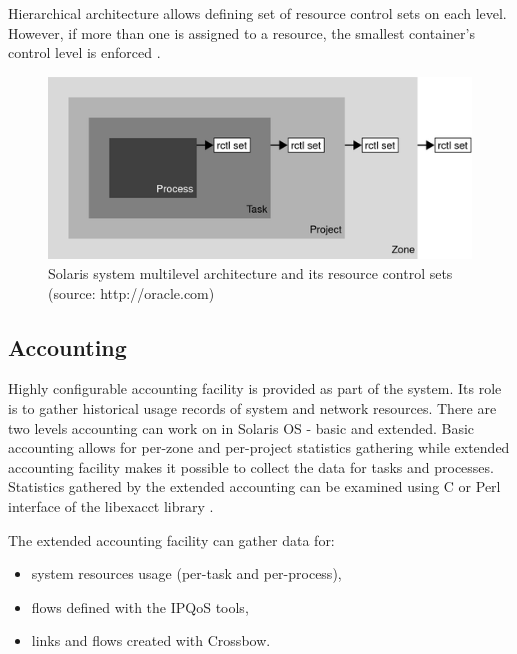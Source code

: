 \documentclass[11pt]{book}
\begin{document}
      Hierarchical architecture allows defining set of resource control sets on each level. However, if more than one is
      assigned to a resource, the smallest container's control level is enforced \cite{oracle_admin_guide}. 

      \begin{figure}[H]
        \begin{center}
          \includegraphics[width=.7\textwidth]{img/rctrl.png}
        \end{center}
        
        \caption{Solaris system multilevel architecture and its resource control sets (source: http://oracle.com)}
		  \end{figure}


      \subsection{Accounting}
      \label{sub:sol:acct}

        Highly configurable accounting facility is provided as part of the system. Its role is to gather historical
        usage records of system and network resources. There are two levels accounting can work on in Solaris
        OS - basic and extended. Basic accounting allows for per-zone and per-project statistics gathering while
        extended accounting facility makes it possible to collect the data for tasks and processes. Statistics gathered
        by the extended accounting can be examined using C or Perl interface of the libexacct library \cite{sag}.

        The extended accounting facility can gather data for:

        \begin{itemize}
          \item system resources usage (per-task and per-process),
          \item flows defined with the IPQoS tools,
          \item links and flows created with Crossbow.
        \end{itemize}
\end{document}
